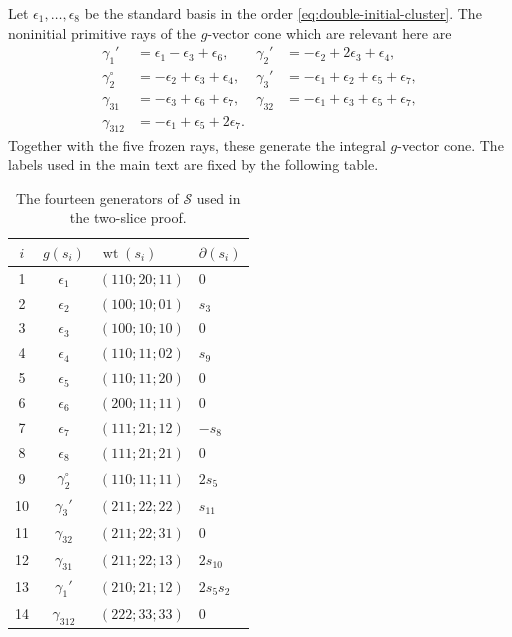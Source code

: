\documentclass[11pt,reqno]{amsart}
\numberwithin{equation}{section}
\theoremstyle{remark}
\newcommand{\SR}{\mathscr S}
\newcommand{\wt}{\operatorname{wt}}
\begin{document}
Let $\epsilon_1,\ldots,\epsilon_8$ be the standard basis in the order
\eqref{eq:double-initial-cluster}.  The noninitial primitive rays of the
$g$-vector cone which are relevant here are
\begin{equation*}
 \begin{aligned}
 \gamma_1'&=\epsilon_1-\epsilon_3+\epsilon_6,&
 \gamma_2'&=-\epsilon_2+2\epsilon_3+\epsilon_4,\\
 \gamma_2^\circ&=-\epsilon_2+\epsilon_3+\epsilon_4,&
 \gamma_3'&=-\epsilon_1+\epsilon_2+\epsilon_5+\epsilon_7,\\
 \gamma_{31}&=-\epsilon_3+\epsilon_6+\epsilon_7,&
 \gamma_{32}&=-\epsilon_1+\epsilon_3+\epsilon_5+\epsilon_7,\\
 \gamma_{312}&=-\epsilon_1+\epsilon_5+2\epsilon_7.
 \end{aligned}
\end{equation*}
Together with the five frozen rays, these generate the integral
$g$-vector cone.  The labels used in the main text are fixed by the
following table.
\begin{table}[ht]
\centering
\small
\caption{The fourteen generators of $\SR$ used in the two-slice proof.}
\label{tab:partial-generators}
\begin{tabular}{ccll}
\toprule
$i$&$g(s_i)$&$\wt(s_i)$&$\partial(s_i)$\\ \midrule
1&$\epsilon_1$&$(110;20;11)$&0\\
2&$\epsilon_2$&$(100;10;01)$&$s_3$\\
3&$\epsilon_3$&$(100;10;10)$&0\\
4&$\epsilon_4$&$(110;11;02)$&$s_9$\\
5&$\epsilon_5$&$(110;11;20)$&0\\
6&$\epsilon_6$&$(200;11;11)$&0\\
7&$\epsilon_7$&$(111;21;12)$&$-s_8$\\
8&$\epsilon_8$&$(111;21;21)$&0\\ \midrule
9&$\gamma_2^\circ$&$(110;11;11)$&$2s_5$\\
10&$\gamma_3'$&$(211;22;22)$&$s_{11}$\\
11&$\gamma_{32}$&$(211;22;31)$&0\\
12&$\gamma_{31}$&$(211;22;13)$&$2s_{10}$\\
13&$\gamma_1'$&$(210;21;12)$&$2s_5s_2$\\
14&$\gamma_{312}$&$(222;33;33)$&0\\
\bottomrule
\end{tabular}
\end{table}
\end{document}
